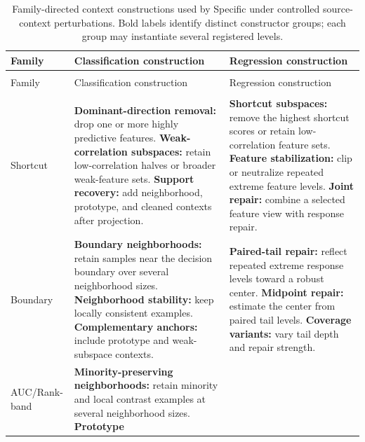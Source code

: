 \begingroup
  \footnotesize
  \setlength{\LTpre}{0.45\baselineskip}
  \setlength{\LTpost}{0.45\baselineskip}
  \begin{longtable}{@{}>{\raggedright\arraybackslash}p{} >{\raggedright\arraybackslash}p{} >{\raggedright\arraybackslash}p{}@{}}
    \caption{Family-directed context constructions used by Specific under
    controlled source-context perturbations. Bold labels identify distinct
    constructor groups; each group may instantiate several registered levels.}
    \label{tab:specific-perturbation-contexts} \\
    \toprule
    Family & Classification construction & Regression construction \\
    \midrule
    \endfirsthead
    \multicolumn{3}{@{}l}{\tablename~\thetable\ (continued)} \\
    \toprule
    Family & Classification construction & Regression construction \\
    \midrule
    \endhead
    \midrule
    \multicolumn{3}{r@{}}{Continued on next page} \\
    \endfoot
    \bottomrule
    \endlastfoot
    Shortcut
      & \textbf{Dominant-direction removal:} drop one or more highly predictive
        features. \textbf{Weak-correlation subspaces:} retain low-correlation
        halves or broader weak-feature sets. \textbf{Support recovery:} add
        neighborhood, prototype, and cleaned contexts after projection.
      & \textbf{Shortcut subspaces:} remove the highest shortcut scores or
        retain low-correlation feature sets. \textbf{Feature stabilization:}
        clip or neutralize repeated extreme feature levels. \textbf{Joint
        repair:} combine a selected feature view with response repair. \\
    Boundary
      & \textbf{Boundary neighborhoods:} retain samples near the decision
        boundary over several neighborhood sizes. \textbf{Neighborhood
        stability:} keep locally consistent examples. \textbf{Complementary
        anchors:} include prototype and weak-subspace contexts.
      & \textbf{Paired-tail repair:} reflect repeated extreme response levels
        toward a robust center. \textbf{Midpoint repair:} estimate the center
        from paired tail levels. \textbf{Coverage variants:} vary tail depth
        and repair strength. \\
    AUC/Rank-band
      & \textbf{Minority-preserving neighborhoods:} retain minority and local
        contrast examples at several neighborhood sizes. \textbf{Prototype
}
\end{longtable}

